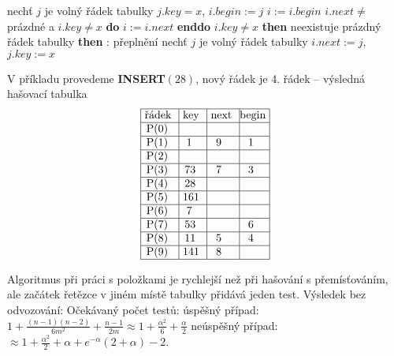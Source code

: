\documentclass[a4paper,12pt]{article}
\begin{document}
\phantom{------}{\bf else}\newline 
\phantom{---------}nechť $j$ je volný řádek tabulky\newline 
\phantom{---------}$j.key=x$, $i.begin:=j$\newline 
\phantom{------}{\bf endif}\newline 
\phantom{---}{\bf endif\newline 
else}\newline 
\phantom{---}$i:=i.begin$\newline
\phantom{---}{\bf while} $i.next\ne$prázdné a $i.key\ne x$ {\bf do} $i:=i.next$ {\bf enddo}\newline 
\phantom{---}{\bf if} $i.key\ne x$ {\bf then}\newline 
\phantom{------}{\bf if} neexistuje prázdný řádek tabulky {\bf then}\newline 
\phantom{---------}{\bf Výstup}: přeplnění\newline 
\phantom{------}{\bf else}\newline 
\phantom{---------}nechť $j$ je volný řádek tabulky\newline 
\phantom{---------}$i.next:=j$, $j.key:=x$\newline 
\phantom{------}{\bf endif}\newline 
\phantom{---}{\bf endif\newline 
endif}


V příkladu provedeme {\bf INSERT$(28)$}, nový řádek je 4. 
řádek\newline 
-- výsledná hašovací tabulka
$$\vtop{\offinterlineskip\halign {\strut\vrule\ # & \vrule\ # & \vrule\ # & \vrule \hfil # \hfil \vrule\cr\noalign{\hrule}řádek & key & next & begin\hfil \cr\noalign{\hrule}P(0) & & &\hfill \cr\noalign{\hrule}P(1) & 1 & 9 & 1 \cr\noalign{\hrule}P(2) & & &\hfill \cr\noalign{\hrule}P(3) & 73 & 7 & 3 \cr\noalign{\hrule}P(4) & 28 &  &\hfill \cr\noalign{\hrule}P(5) & 161 & & \hfill \cr\noalign{\hrule}P(6) & 7 & &\hfill \cr\noalign{\hrule}P(7) & 53 & & 6 \cr\noalign{\hrule}P(8) & 11 & 5 & 4  \cr\noalign{\hrule}P(9) & 141 & 8 & \hfill \cr\noalign{\hrule}}}$$

Algoritmus při práci s položkami je rychlejší než při 
hašování s přemísťováním, ale začátek řetězce v 
jiném místě tabulky přidává jeden test. Výsledek bez 
odvozování:\newline 
Očekávaný počet testů:\newline 
\phantom{---}úspěšný případ: $1+\frac {(n-1)(n-2
)}{6m^2}+\frac {n-1}{2m}\approx 1+\frac {\alpha^2}6+\frac {\alpha}
2$\newline 
\phantom{---}neúspěšný případ: $\approx 1+\frac {
\alpha^2}2+\alpha +e^{-\alpha}(2+\alpha )-2$.
\end{document}
